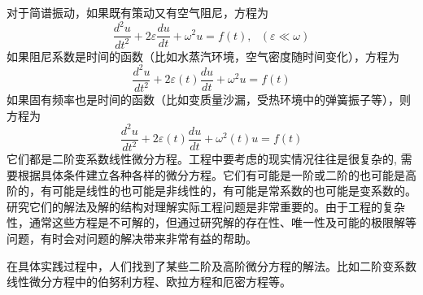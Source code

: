 对于简谱振动，如果既有策动又有空气阻尼，方程为
\begin{equation*}
    \frac{d^2 u}{d t^2} +2\varepsilon \frac{d u}{dt} +\omega ^2 u = f(t) ,  ~~~ (\varepsilon \ll \omega)   
  \end{equation*} 
如果阻尼系数是时间的函数（比如水蒸汽环境，空气密度随时间变化），方程为
\begin{equation*}
	  \frac{d^2 u}{d t^2} +2\varepsilon(t) \frac{d u}{dt} +\omega ^2 u = f(t)
	\end{equation*}
如果固有频率也是时间的函数（比如变质量沙漏，受热环境中的弹簧振子等），则方程为
	\begin{equation*}
		  \frac{d^2 u}{d t^2} +2\varepsilon(t) \frac{d u}{dt} +\omega^2 (t)  u = f(t)
	\end{equation*}
它们都是二阶变系数线性微分方程。工程中要考虑的现实情况往往是很复杂的, 需要根据具体条件建立各种各样的微分方程。它们有可能是一阶或二阶的也可能是高阶的，有可能是线性的也可能是非线性的，有可能是常系数的也可能是变系数的。研究它们的解法及解的结构对理解实际工程问题是非常重要的。由于工程的复杂性，通常这些方程是不可解的，但通过研究解的存在性、唯一性及可能的极限解等问题，有时会对问题的解决带来非常有益的帮助。

在具体实践过程中，人们找到了某些二阶及高阶微分方程的解法。比如二阶变系数线性微分方程中的伯努利方程、欧拉方程和厄密方程等。

